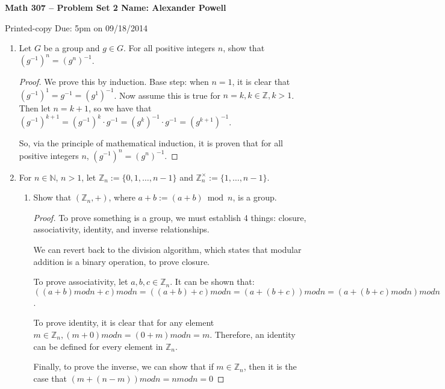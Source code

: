\documentclass[a4paper]{article}
\begin{document}
\textbf{Math 307 -- Problem Set 2 \hfill Name: Alexander Powell}

Printed-copy Due: 5pm on 09/18/2014

\begin{enumerate}[leftmargin=.5in,label=(\textbf{\arabic*})]
\item Let $G$ be a group and $g \in G$. For all positive integers $n$, show that $(g^{-1})^n = (g^n)^{-1}$. 
\begin{proof}

We prove this by induction.  Base step: when $n=1$, it is clear that $(g^{-1})^{1} = g^{-1} = (g^{1})^{-1}$.  Now assume this is true for $n = k, k \in \mathbb{Z}, k > 1$.  Then let $n=k+1$, so we have that $(g^{-1})^{k+1} = (g^{-1})^{k} \cdot g^{-1} = (g^{k})^{-1} \cdot g^{-1} = (g^{k+1})^{-1}$.  

So, via the principle of mathematical induction, it is proven that for all positive integers $n$, $(g^{-1})^n = (g^n)^{-1}$. 

\end{proof}

\item For $n \in \mathbb{N}$, $n>1$, let $\mathbb{Z}_n := \{0,1, \dots, n-1\}$ and $\mathbb{Z}_n^\times := \{1, \dots, n-1\}$.

\begin{enumerate}[leftmargin=*, label=(\textbf{\alph*})]
\item Show that $\left( \mathbb{Z}_n,+ \right)$, where $a+b:= (a+b)\bmod{n}$, is a group.

\begin{proof}

To prove something is a group, we must establish 4 things: closure, associativity, identity, and inverse relationships.  

We can revert back to the division algorithm, which states that modular addition is a binary operation, to prove closure.  

To prove associativity, let $a,b,c \in \mathbb{Z}_n$.  It can be shown that:
$((a+b)mod n + c)mod n = ((a+b)+c)mod n = (a+(b+c))mod n = (a+(b+c)mod n)mod n$.  

To prove identity, it is clear that for any element $m \in \mathbb{Z}_n, (m+0)mod n = (0+m)mod n = m$.  Therefore, an identity can be defined for every element in $\mathbb{Z}_n$.  

Finally, to prove the inverse, we can show that if $m \in \mathbb{Z}_n$, then it is the case that $(m+(n-m))mod n = n mod n = 0$


\end{proof}
\end{enumerate}
\end{enumerate}
\end{document}
